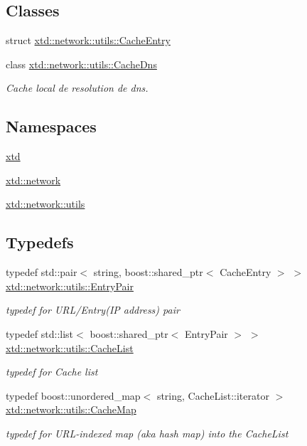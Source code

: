 \subsection*{Classes}
\begin{DoxyCompactItemize}
\item 
struct \hyperlink{structxtd_1_1network_1_1utils_1_1CacheEntry}{xtd\+::network\+::utils\+::\+Cache\+Entry}
\item 
class \hyperlink{classxtd_1_1network_1_1utils_1_1CacheDns}{xtd\+::network\+::utils\+::\+Cache\+Dns}
\begin{DoxyCompactList}\small\item\em Cache local de resolution de dns. \end{DoxyCompactList}\end{DoxyCompactItemize}
\subsection*{Namespaces}
\begin{DoxyCompactItemize}
\item 
 \hyperlink{namespacextd}{xtd}
\item 
 \hyperlink{namespacextd_1_1network}{xtd\+::network}
\item 
 \hyperlink{namespacextd_1_1network_1_1utils}{xtd\+::network\+::utils}
\end{DoxyCompactItemize}
\subsection*{Typedefs}
\begin{DoxyCompactItemize}
\item 
typedef std\+::pair$<$ string, boost\+::shared\+\_\+ptr$<$ Cache\+Entry $>$ $>$ \hyperlink{namespacextd_1_1network_1_1utils_a1118a93e3ee4c3aba74b90600794145b}{xtd\+::network\+::utils\+::\+Entry\+Pair}
\begin{DoxyCompactList}\small\item\em typedef for U\+R\+L/\+Entry(IP address) pair \end{DoxyCompactList}\item 
typedef std\+::list$<$ boost\+::shared\+\_\+ptr$<$ Entry\+Pair $>$ $>$ \hyperlink{namespacextd_1_1network_1_1utils_a6eef494cdc6ca2b10bf4f36f6fa110ee}{xtd\+::network\+::utils\+::\+Cache\+List}
\begin{DoxyCompactList}\small\item\em typedef for Cache list \end{DoxyCompactList}\item 
typedef boost\+::unordered\+\_\+map$<$ string, Cache\+List\+::iterator $>$ \hyperlink{namespacextd_1_1network_1_1utils_aa648e4975dce81f2fd0a9999f684781d}{xtd\+::network\+::utils\+::\+Cache\+Map}
\begin{DoxyCompactList}\small\item\em typedef for U\+R\+L-\/indexed map (aka hash map) into the Cache\+List \end{DoxyCompactList}\end{DoxyCompactItemize}
